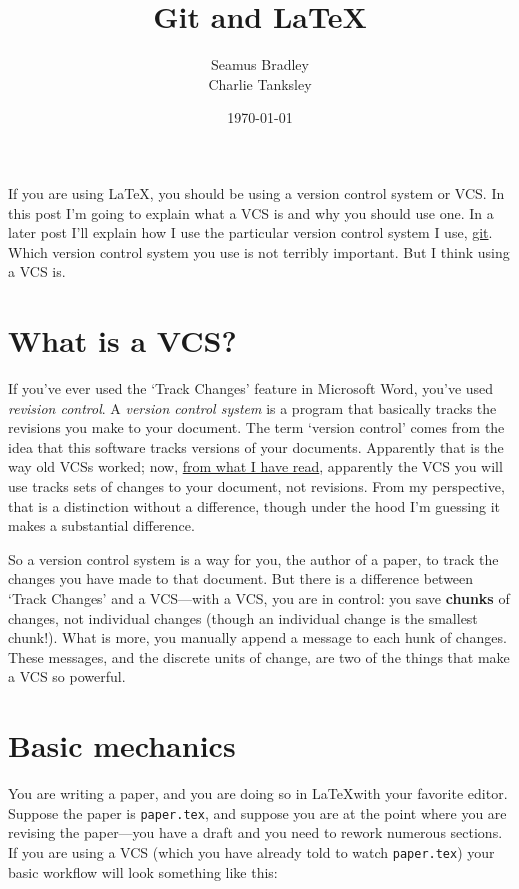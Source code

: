 \documentclass{article}
\title{Git and \LaTeX}
\author{Seamus Bradley\\Charlie Tanksley}
\date{\today}
\begin{document}
\lstset{language=[LaTeX]TeX,breaklines=true,frame=single,frameround=tttt}
  \maketitle
  \tableofcontents

If you are using \LaTeX, you should be using a version control system 
or VCS. In this post I’m going to explain what a VCS is and why you 
should use one. In a later post I’ll explain how I use the particular 
version control system I use, \href{http://git-scm.com}{git}. Which 
version control system you use is not terribly important. But I think 
using a VCS is.

\section{What is a VCS?}

If you’ve ever used the ‘Track Changes’ feature in Microsoft Word, 
you’ve used \emph{revision control}. A \emph{version control system} 
is a program that basically tracks the revisions you make to your 
document. The term ‘version control’ comes from the idea that this 
software tracks versions of your documents. Apparently that is the way 
old VCSs worked; now, 
\href{http://www.joelonsoftware.com/items/2010/03/17.html}{from what I 
  have read}, apparently the VCS you will use tracks sets of changes 
to your document, not revisions. From my perspective, that is a 
distinction without a difference, though under the hood I’m guessing 
it makes a substantial difference.

So a version control system is a way for you, the author of a paper, 
to track the changes you have made to that document. But there is a 
difference between ‘Track Changes’ and a VCS—with a VCS, you are in 
control: you save \textbf{chunks} of changes, not individual changes 
(though an individual change is the smallest chunk!). What is more, 
you manually append a message to each hunk of changes. These messages, 
and the discrete units of change, are two of the things that make a 
VCS so powerful.

\section{Basic mechanics}

You are writing a paper, and you are doing so in \LaTeX with your 
favorite editor.  Suppose the paper is \verb!paper.tex!, and suppose 
you are at the point where you are revising the paper—you have a draft 
and you need to rework numerous sections. If you are using a VCS 
(which you have already told to watch \verb!paper.tex!) your basic 
workflow will look something like this:
\end{document}
